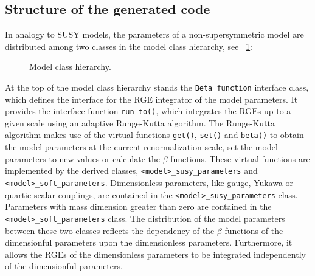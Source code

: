 \documentclass[final,3p,11pt,pdflatex]{elsarticle}
\newcommand{\code}[1]{\lstinline|#1|}  %
\newcommand{\figref}[1]{\figurename~\ref{#1}}
\begin{document}
\subsection{Structure of the generated code}

In analogy to SUSY models, the parameters of a non-supersymmetric
model are distributed among two classes in the model class
hierarchy, see \figref{fig:parameter-classes}:
%
\begin{figure}[tbh]
  \centering
  \caption{Model class hierarchy.}
  \label{fig:parameter-classes}
\end{figure}
%
At the top of the model class hierarchy stands the
\code{Beta_function} interface class, which defines the interface for
the RGE integrator of the model parameters.  It provides the interface
function \code{run_to()}, which integrates the RGEs up to a given
scale using an adaptive Runge-Kutta algorithm.  The Runge-Kutta
algorithm makes use of the virtual functions \code{get()},
\code{set()} and \code{beta()} to obtain the model parameters at the
current renormalization scale, set the model parameters to new values
or calculate the $\beta$ functions.  These virtual functions are
implemented by the derived classes, \code{<model>_susy_parameters} and
\code{<model>_soft_parameters}.  Dimensionless parameters, like
gauge, Yukawa or quartic scalar couplings, are contained in the
\code{<model>_susy_parameters} class.  Parameters with mass dimension
greater than zero are contained in the \code{<model>_soft_parameters}
class.  The distribution of the model parameters between these two
classes reflects the dependency of the
$\beta$ functions of the dimensionful parameters upon the
dimensionless parameters.  Furthermore, it allows
the RGEs of the dimensionless parameters to be integrated independently of the
dimensionful parameters.
\end{document}
